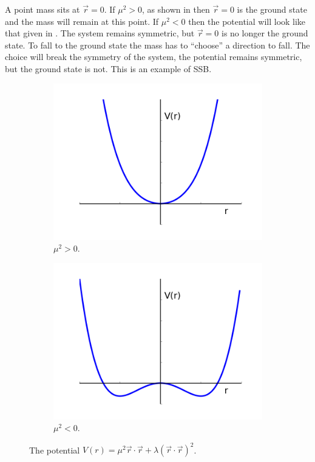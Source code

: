 A point mass sits at $\vec{r}=0$. If $\mu^{2}>0$, as shown in
 then $\vec{r}=0$ is the ground state and
the mass will remain at this point.
If $\mu^{2}<0$ then the potential will look like that given in
. The system remains symmetric, but $\vec{r}=0$ is no longer
the ground state. To fall to the ground state the mass has to ``choose'' a
direction to fall. The choice will break the symmetry of the system, the
potential remains symmetric, but the ground state is not. This is an example of
{SSB}.

\begin{figure}[htbp]
  \centering
  \begin{subfigure}{0.45\textwidth}
    \centering
    \includegraphics[width=\textwidth]{higgs_pot_mup}
    \caption{$\mu^{2}>0$.}
    \label{fig:higgs_pot_mup}
  \end{subfigure}
  \begin{subfigure}{0.45\textwidth}
    \centering
    \includegraphics[width=\textwidth]{higgs_pot_mum}
    \caption{$\mu^{2}<0$.}
    \label{fig:higgs_pot_mum}
  \end{subfigure}
  \caption{The potential $ V(r) = \mu^{2} \vec{r} \cdot \vec{r} + \lambda (
\vec{r} \cdot \vec{r} )^{2}$.}
  \label{fig:higgs_pot}
\end{figure}

